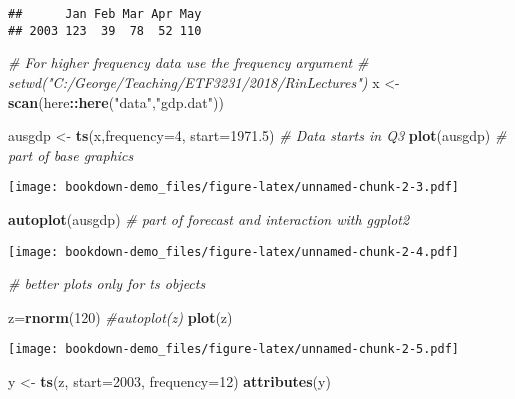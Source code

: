 \documentclass[]{book}
\newenvironment{Shaded}{\begin{snugshade}}{\end{snugshade}}
\newcommand{\CommentTok}[1]{\textcolor[rgb]{0.56,0.35,0.01}{\textit{#1}}}
\newcommand{\DataTypeTok}[1]{\textcolor[rgb]{0.13,0.29,0.53}{#1}}
\newcommand{\DecValTok}[1]{\textcolor[rgb]{0.00,0.00,0.81}{#1}}
\newcommand{\FloatTok}[1]{\textcolor[rgb]{0.00,0.00,0.81}{#1}}
\newcommand{\KeywordTok}[1]{\textcolor[rgb]{0.13,0.29,0.53}{\textbf{#1}}}
\newcommand{\NormalTok}[1]{#1}
\newcommand{\OperatorTok}[1]{\textcolor[rgb]{0.81,0.36,0.00}{\textbf{#1}}}
\newcommand{\StringTok}[1]{\textcolor[rgb]{0.31,0.60,0.02}{#1}}
\begin{document}
\begin{verbatim}
##      Jan Feb Mar Apr May
## 2003 123  39  78  52 110
\end{verbatim}

\begin{Shaded}
\begin{Highlighting}[]
  \CommentTok{# For higher frequency data use the frequency argument }
  \CommentTok{#  setwd("C:/George/Teaching/ETF3231/2018/RinLectures")}
\NormalTok{x <-}\StringTok{ }\KeywordTok{scan}\NormalTok{(here}\OperatorTok{::}\KeywordTok{here}\NormalTok{(}\StringTok{"data"}\NormalTok{,}\StringTok{"gdp.dat"}\NormalTok{))}
  
\NormalTok{ausgdp <-}\StringTok{ }\KeywordTok{ts}\NormalTok{(x,}\DataTypeTok{frequency=}\DecValTok{4}\NormalTok{,}
             \DataTypeTok{start=}\FloatTok{1971.5}\NormalTok{) }\CommentTok{# Data starts in Q3}
  \KeywordTok{plot}\NormalTok{(ausgdp) }\CommentTok{# part of base graphics}
\end{Highlighting}
\end{Shaded}

\texttt{[image: bookdown-demo\_files/figure-latex/unnamed-chunk-2-3.pdf]}

\begin{Shaded}
\begin{Highlighting}[]
  \KeywordTok{autoplot}\NormalTok{(ausgdp)  }\CommentTok{# part of forecast and interaction with ggplot2}
\end{Highlighting}
\end{Shaded}

\texttt{[image: bookdown-demo\_files/figure-latex/unnamed-chunk-2-4.pdf]}

\begin{Shaded}
\begin{Highlighting}[]
                    \CommentTok{# better plots only for ts objects}

\NormalTok{z=}\KeywordTok{rnorm}\NormalTok{(}\DecValTok{120}\NormalTok{)}
\CommentTok{#autoplot(z) }
\KeywordTok{plot}\NormalTok{(z)}
\end{Highlighting}
\end{Shaded}

\texttt{[image: bookdown-demo\_files/figure-latex/unnamed-chunk-2-5.pdf]}

\begin{Shaded}
\begin{Highlighting}[]
\NormalTok{  y <-}\StringTok{ }\KeywordTok{ts}\NormalTok{(z, }\DataTypeTok{start=}\DecValTok{2003}\NormalTok{, }\DataTypeTok{frequency=}\DecValTok{12}\NormalTok{)}
  \KeywordTok{attributes}\NormalTok{(y)}
\end{Highlighting}
\end{Shaded}
\end{document}
